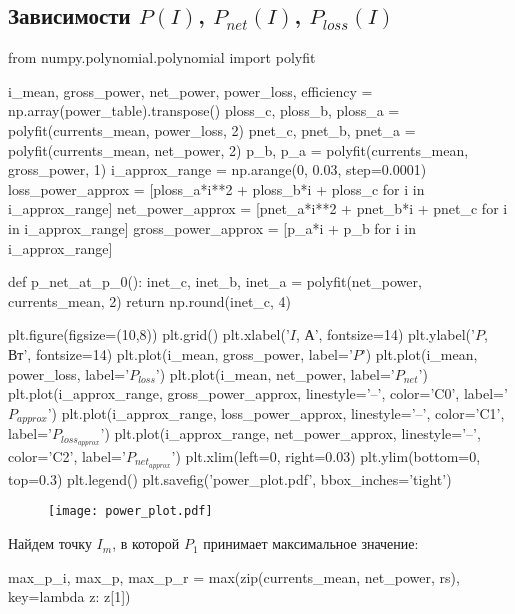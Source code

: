\documentclass[12pt, a4paper]{article}
\begin{document}
\begin{table}[H]
\end{table} 

\subsection*{Зависимости $P(I)$, $P_{net}(I)$, $P_{loss}(I)$}

\begin{pycode}
from numpy.polynomial.polynomial import polyfit

i_mean, gross_power, net_power, power_loss, efficiency = np.array(power_table).transpose()
ploss_c, ploss_b, ploss_a = polyfit(currents_mean, power_loss, 2)
pnet_c, pnet_b, pnet_a = polyfit(currents_mean, net_power, 2)
p_b, p_a = polyfit(currents_mean, gross_power, 1)
i_approx_range = np.arange(0, 0.03, step=0.0001)
loss_power_approx = [ploss_a*i**2 + ploss_b*i + ploss_c for i in i_approx_range]
net_power_approx = [pnet_a*i**2 + pnet_b*i + pnet_c for i in i_approx_range]
gross_power_approx = [p_a*i + p_b for i in i_approx_range]

def p_net_at_p_0():
  inet_c, inet_b, inet_a = polyfit(net_power, currents_mean, 2)
  return np.round(inet_c, 4)

plt.figure(figsize=(10,8))
plt.grid()
plt.xlabel('$I$, А', fontsize=14)
plt.ylabel('$P$, Вт', fontsize=14)
plt.plot(i_mean, gross_power, label='$P$')
plt.plot(i_mean, power_loss, label='$P_{loss}$')
plt.plot(i_mean, net_power, label='$P_{net}$')
plt.plot(i_approx_range, gross_power_approx, linestyle='--', color='C0', label='$P_{approx}$')
plt.plot(i_approx_range, loss_power_approx, linestyle='--', color='C1', label='$P_{loss_{approx}}$')
plt.plot(i_approx_range, net_power_approx, linestyle='--', color='C2', label='$P_{net_{approx}}$')
plt.xlim(left=0, right=0.03)
plt.ylim(bottom=0, top=0.3)
plt.legend()
plt.savefig('power_plot.pdf', bbox_inches='tight')
\end{pycode}

\begin{figure}[H]
\texttt{[image: power\_plot.pdf]}
\end{figure}
\newpage

Найдем точку $I_m$, в которой $P_1$ принимает максимальное значение:

\begin{pycode}
max_p_i, max_p, max_p_r = max(zip(currents_mean, net_power, rs),
key=lambda z: z[1])
\end{pycode}
\end{document}
